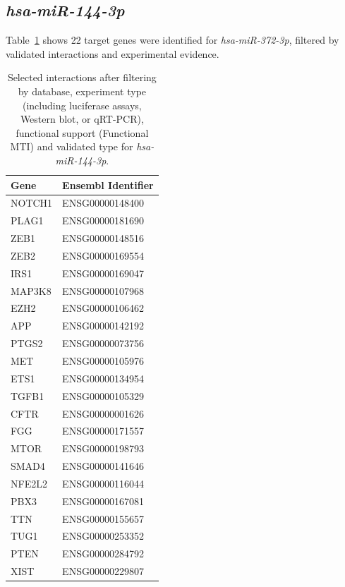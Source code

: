 \documentclass[
  11pt,
  letterpaper,
]{book}
\begin{document}
\subsection{\texorpdfstring{\emph{hsa-miR-144-3p}}{hsa-miR-144-3p}}\label{hsa-mir-144-3p}

Table~\ref{tbl-hsa-miR-144-3p} shows 22 target genes were identified for
\emph{hsa-miR-372-3p}, filtered by validated interactions and
experimental evidence.

\begingroup\fontsize{11}{13}\selectfont

\begin{longtable}[t]{ll}

\caption{\label{tbl-hsa-miR-144-3p}Selected interactions after filtering
by database, experiment type (including luciferase assays, Western blot,
or qRT-PCR), functional support (Functional MTI) and validated type for
\emph{hsa-miR-144-3p}.}

\tabularnewline

\toprule
\textbf{Gene} & \textbf{Ensembl Identifier}\\
\midrule
NOTCH1 & ENSG00000148400\\
PLAG1 & ENSG00000181690\\
ZEB1 & ENSG00000148516\\
ZEB2 & ENSG00000169554\\
IRS1 & ENSG00000169047\\
\addlinespace
MAP3K8 & ENSG00000107968\\
EZH2 & ENSG00000106462\\
APP & ENSG00000142192\\
PTGS2 & ENSG00000073756\\
MET & ENSG00000105976\\
\addlinespace
ETS1 & ENSG00000134954\\
TGFB1 & ENSG00000105329\\
CFTR & ENSG00000001626\\
FGG & ENSG00000171557\\
MTOR & ENSG00000198793\\
\addlinespace
SMAD4 & ENSG00000141646\\
NFE2L2 & ENSG00000116044\\
PBX3 & ENSG00000167081\\
TTN & ENSG00000155657\\
TUG1 & ENSG00000253352\\
\addlinespace
PTEN & ENSG00000284792\\
XIST & ENSG00000229807\\
\bottomrule

\end{longtable}
\end{document}
